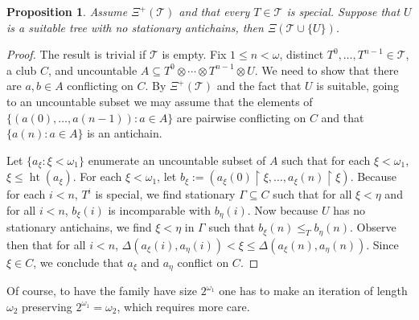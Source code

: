 \documentclass[a4paper,noamsfonts]{amsart}
\newtheorem{proposition}[theorem]{Proposition}
\theoremstyle{definition}
\newcommand{\seb}{\subseteq}
\newcommand{\res}{\!\upharpoonright\!}
\newcommand{\1}{\mathbf{1}}
\newcommand{\T}{\mathcal{T}}
\newcommand{\prop}{\Xi}
\newcommand{\propp}{\prop^{+}}
\DeclareMathOperator{\hht}{ht}
\begin{document}
\begin{proposition}
  Assume $\propp(\T)$ and that every $T \in \T$ is special.
  Suppose that $U$ is
  a suitable tree with no stationary antichains, then $\prop(\T \cup \{U\})$.
\end{proposition}
\begin{proof}
  The result is trivial if $\T$ is empty. Fix $1 \le n < \omega$,
  distinct $T^{0},\dots,T^{n-1} \in \T$, a club $C$,
  and uncountable
  $A \seb T^{0}\otimes \cdots \otimes T^{n-1} \otimes U$. We need to
  show that there are $a,b \in A$ conflicting on $C$.
  By $\propp(\T)$ and the fact that $U$ is suitable, going to an uncountable
  subset we may assume that the elements of $\{(a(0),\dots,a(n-1)) : a \in A\}$
  are pairwise conflicting on $C$ and that $\{a(n) : a \in A\}$ is an antichain.

  Let $\{a_{\xi} : \xi < \omega_{1}\}$
  enumerate an uncountable subset of $A$ such that
  for each $\xi < \omega_{1}$, $\xi \le \hht(a_{\xi})$.
  For each $\xi < \omega_{1}$, let $b_{\xi} := (a_{\xi}(0)\res \xi,\dots,
  a_{\xi}(n)\res \xi)$. Because for each $i < n$, $T^{i}$ is special,
  we find stationary $\Gamma \seb C$ such that for all
  $\xi < \eta$ and for all $i < n$, $b_{\xi}(i)$ is incomparable
  with $b_{\eta}(i)$. Now because $U$ has no stationary antichains,
  we find $\xi < \eta$ in $\Gamma$ such that
  $b_{\xi}(n) \le_{T} b_{\eta}(n)$. Observe then
  that for all $i < n$,
  $\Delta(a_{\xi}(i),a_{\eta}(i)) < \xi \le \Delta(a_{\xi}(n),a_{\eta}(n))$.
  Since $\xi \in C$, we conclude that $a_{\xi}$ and $a_{\eta}$ conflict on $C$.
\end{proof}

Of course, to have the family have size $2^{\omega_{1}}$ one has to make
an iteration of length $\omega_{2}$ preserving $2^{\omega_{1}} = \omega_{2}$,
which requires more care.
\end{document}
